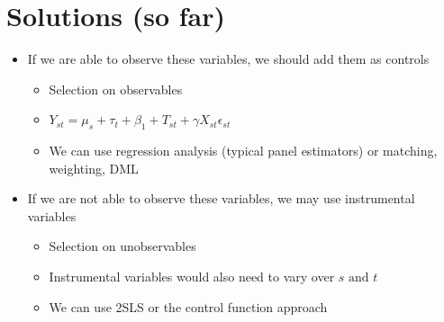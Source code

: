 \documentclass[10pt]{article}
\begin{document}
\section{Solutions (so far)}
\begin{itemize}
    \item If we are able to observe these variables, we should add them as controls 
    \begin{itemize}
        \item Selection on observables
        \item $Y_{st} = \mu_s + \tau_t + \beta_1 + T_{st} + \gamma X_{st} \epsilon_{st} $
        \item We can use regression analysis (typical panel estimators) or matching, weighting, DML 
    \end{itemize}
    \item If we are not able to observe these variables, we may use instrumental variables 
    \begin{itemize}
        \item Selection on unobservables 
        \item Instrumental variables would also need to vary over $s \text{ and } t $
        \item We can use 2SLS or the control function approach 
    \end{itemize}
\end{itemize}
\end{document}
